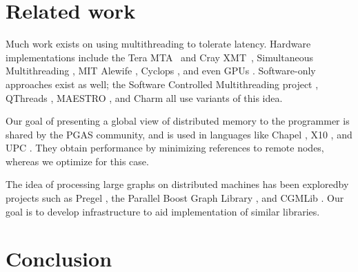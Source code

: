 \documentclass[10pt,nocopyrightspace,preprint]{sigplanconf}
\begin{document}
\section{Related work}
\label{sec:related}


Much work exists on using multithreading to tolerate latency. Hardware
implementations include the Tera MTA~\cite{tera} and Cray
XMT~\cite{feo-xmt}, Simultaneous Multithreading \cite{tullsen-smt},
MIT Alewife \cite{agarwal-alewife}, Cyclops \cite{almasi-cyclops}, and
even GPUs \cite{gpus}. Software-only approaches exist as well; the
Software Controlled Multithreading project \cite{mowry-scm}, QThreads
\cite{qthreads}, MAESTRO \cite{maestro}, and Charm \cite{charm} all
use variants of this idea.

Our goal of presenting a global view of distributed memory to the
programmer is shared by the PGAS community, and is used in languages
like Chapel \cite{chapel}, X10 \cite{X10}, and UPC \cite{upc}. They
obtain performance by minimizing references to remote nodes, whereas we
optimize for this case.

The idea of processing large graphs on distributed machines has been
exploredby projects such as Pregel \cite{pregel}, the Parallel Boost
Graph Library \cite{parallelbgl}, and CGMLib \cite{cgmlib}. Our goal
is to develop infrastructure to aid implementation of similar
libraries.

\section{Conclusion}
\label{sec:conclusion}




\end{document}
